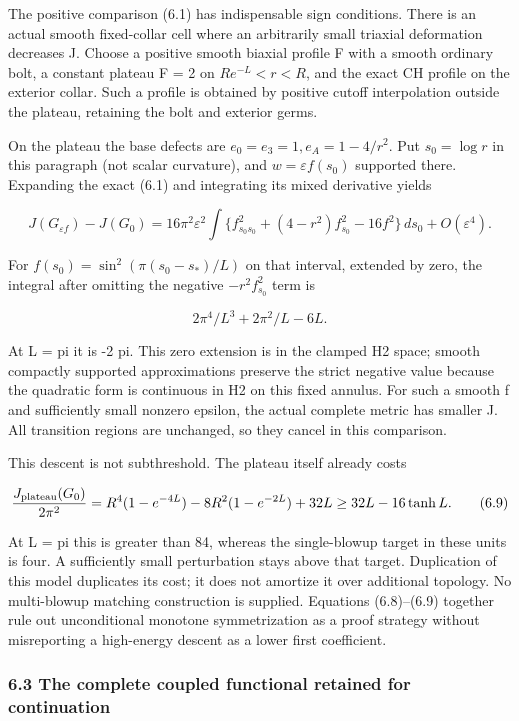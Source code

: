 \documentclass[
  10pt,
]{article}
\begin{document}
The positive comparison (6.1) has indispensable sign conditions. There
is an actual smooth fixed-collar cell where an arbitrarily small
triaxial deformation decreases J. Choose a positive smooth biaxial
profile F with a smooth ordinary bolt, a constant plateau F = 2 on
\(R e^{-L}<r<R\), and the exact CH profile on the exterior collar. Such
a profile is obtained by positive cutoff interpolation outside the
plateau, retaining the bolt and exterior germs.

On the plateau the base defects are \(e_0=e_3=1,e_A=1-4/r^2\). Put
\(s_0=\log r\) in this paragraph (not scalar curvature), and
\(w=\varepsilon f(s_0)\) supported there. Expanding the exact (6.1) and
integrating its mixed derivative yields

\[
 J(G_{\varepsilon f})-J(G_0)
 =16\pi^2\varepsilon^2\int
       \{f_{s_0s_0}^2+(4-r^2)f_{s_0}^2-16f^2\}\,ds_0
       +O(\varepsilon^4).                                \tag{6.8}
\]

For \(f(s_0)=\sin^2(\pi(s_0-s_*)/L)\) on that interval, extended by
zero, the integral after omitting the negative \(-r^2f_{s_0}^2\) term is

\[
                   2\pi^4/L^3+2\pi^2/L-6L.
\]

At L = pi it is -2 pi. This zero extension is in the clamped H2 space;
smooth compactly supported approximations preserve the strict negative
value because the quadratic form is continuous in H2 on this fixed
annulus. For such a smooth f and sufficiently small nonzero epsilon, the
actual complete metric has smaller J. All transition regions are
unchanged, so they cancel in this comparison.

This descent is not subthreshold. The plateau itself already costs

\[
 \frac{J_{\rm plateau}(G_0)}{2\pi^2}
 =R^4(1-e^{-4L})-8R^2(1-e^{-2L})+32L
 \ge32L-16\tanh L.                                      \tag{6.9}
\]

At L = pi this is greater than 84, whereas the single-blowup target in
these units is four. A sufficiently small perturbation stays above that
target. Duplication of this model duplicates its cost; it does not
amortize it over additional topology. No multi-blowup matching
construction is supplied. Equations (6.8)--(6.9) together rule out
unconditional monotone symmetrization as a proof strategy without
misreporting a high-energy descent as a lower first coefficient.

\hypertarget{the-complete-coupled-functional-retained-for-continuation}{%
\subsubsection{6.3 The complete coupled functional retained for
continuation}\label{the-complete-coupled-functional-retained-for-continuation}}
\end{document}
